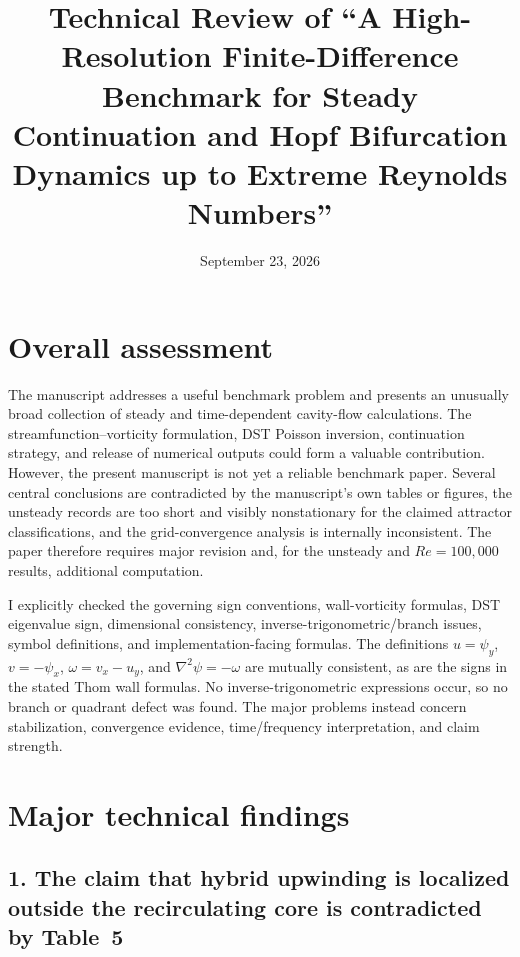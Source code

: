 \documentclass[11pt]{article}
\title{Technical Review of ``A High-Resolution Finite-Difference Benchmark for Steady Continuation and Hopf Bifurcation Dynamics up to Extreme Reynolds Numbers''}
\author{}
\date{September 23, 2026}
\begin{document}
\maketitle

\section*{Overall assessment}

The manuscript addresses a useful benchmark problem and presents an unusually broad collection of steady and time-dependent cavity-flow calculations.  The streamfunction--vorticity formulation, DST Poisson inversion, continuation strategy, and release of numerical outputs could form a valuable contribution.  However, the present manuscript is not yet a reliable benchmark paper.  Several central conclusions are contradicted by the manuscript's own tables or figures, the unsteady records are too short and visibly nonstationary for the claimed attractor classifications, and the grid-convergence analysis is internally inconsistent.  The paper therefore requires major revision and, for the unsteady and $Re=100{,}000$ results, additional computation.

I explicitly checked the governing sign conventions, wall-vorticity formulas, DST eigenvalue sign, dimensional consistency, inverse-trigonometric/branch issues, symbol definitions, and implementation-facing formulas.  The definitions $u=\psi_y$, $v=-\psi_x$, $\omega=v_x-u_y$, and $\nabla^2\psi=-\omega$ are mutually consistent, as are the signs in the stated Thom wall formulas.  No inverse-trigonometric expressions occur, so no branch or quadrant defect was found.  The major problems instead concern stabilization, convergence evidence, time/frequency interpretation, and claim strength.

\section*{Major technical findings}

\subsection*{1. The claim that hybrid upwinding is localized outside the recirculating core is contradicted by Table~5}
\end{document}
